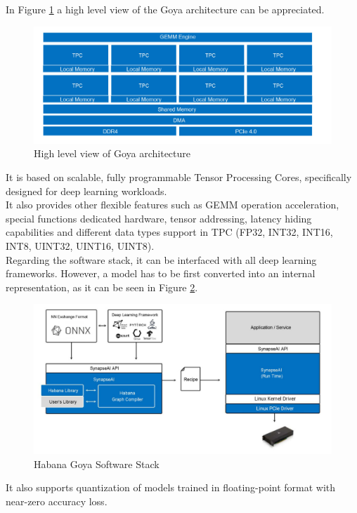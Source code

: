 In Figure \ref{fig:goyaarch} a high level view of the Goya architecture can be appreciated.
\begin{figure}[H]
\centering
\captionsetup{justification=centering}
\includegraphics[scale=0.7]{./figure/goya_arch.PNG}
\caption{High level view of Goya architecture \cite{paper:38}}
\label{fig:goyaarch}
\end{figure}

It is based on scalable, fully programmable Tensor Processing Cores, specifically designed for deep learning workloads. \\
It also provides other flexible features such as GEMM operation acceleration, special functions dedicated hardware, tensor addressing, latency hiding capabilities and different data types support in TPC (FP32, INT32, INT16, INT8, UINT32, UINT16, UINT8).\\

Regarding the software stack, it can be interfaced with all deep learning frameworks. However, a model has to be first converted into an internal representation, as it can be seen in Figure \ref{fig:goyaswstack}.
\begin{figure}[H]
\centering
\captionsetup{justification=centering}
\includegraphics[scale=0.5]{./figure/goya_sw_stack.PNG}
\caption{Habana Goya Software Stack \cite{paper:38}}
\label{fig:goyaswstack}
\end{figure}
It also supports quantization of models trained in floating-point format with near-zero accuracy loss.